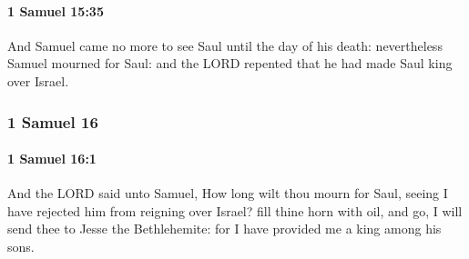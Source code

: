 		\paragraph{1 Samuel 15:35} %
			\label{1SAMUEL-15-35}

			And Samuel came no more to see Saul until the day of his death: nevertheless Samuel mourned for Saul: and the LORD repented that he had made Saul king over Israel.

	\subsubsection{1 Samuel 16} %
		\label{1SAMUEL-16}

		\paragraph{1 Samuel 16:1} %
			\label{1SAMUEL-16-1}

			And the LORD said unto Samuel, How long wilt thou mourn for Saul, seeing I have rejected him from reigning over Israel? fill thine horn with oil, and go, I will send thee to Jesse the Bethlehemite: for I have provided me a king among his sons.

